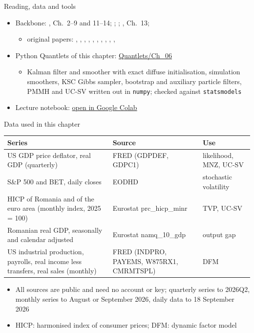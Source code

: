 \begin{frame}{Reading, data and tools}
\itemsize{\small}
\begin{itemize}
    \item Backbone: , Ch.~2--9 and 11--14; ; ; , Ch.~13; 
    \begin{itemize}
        \item original papers: , , , , , , , , , , 
    \end{itemize}
    \item Python Quantlets of this chapter: \href{https://github.com/danpele/Advanced-Time-Series/tree/main/Quantlets/Ch_06}{Quantlets/Ch\_06}
    \begin{itemize}
        \item Kalman filter and smoother with exact diffuse initialisation, simulation smoothers, KSC Gibbs sampler, bootstrap and auxiliary particle filters, PMMH and UC-SV written out in \texttt{numpy}; checked against \texttt{statsmodels}
    \end{itemize}
    \item Lecture notebook: \href{\colaburl{notebooks/EN/chapter6_lecture_notebook.ipynb}}{open in Google Colab}
\end{itemize}
\end{frame}

\begin{frame}{Data used in this chapter}
\itemsize{\footnotesize}
\begin{center}
\scriptsize
\begin{tabular}{>{\raggedright\arraybackslash}p{5.0cm}>{\raggedright\arraybackslash}p{4.4cm}>{\raggedright\arraybackslash}p{2.5cm}}
\toprule
\textbf{Series} & \textbf{Source} & \textbf{Use} \\
\midrule
US GDP price deflator, real GDP (quarterly) & FRED (GDPDEF, GDPC1) & likelihood, MNZ, UC-SV \\
S\&P 500 and BET, daily closes & EODHD & stochastic volatility \\
HICP of Romania and of the euro area (monthly index, 2025 = 100) & Eurostat prc\_hicp\_minr & TVP, UC-SV \\
Romanian real GDP, seasonally and calendar adjusted & Eurostat namq\_10\_gdp & output gap \\
US industrial production, payrolls, real income less transfers, real sales (monthly) & FRED (INDPRO, PAYEMS, W875RX1, CMRMTSPL) & DFM \\
\bottomrule
\end{tabular}
\end{center}
\begin{itemize}
    \item All sources are public and need no account or key; quarterly series to 2026Q2, monthly series to August or September 2026, daily data to 18 September 2026
    \item HICP: harmonised index of consumer prices; DFM: dynamic factor model
\end{itemize}
\end{frame}

